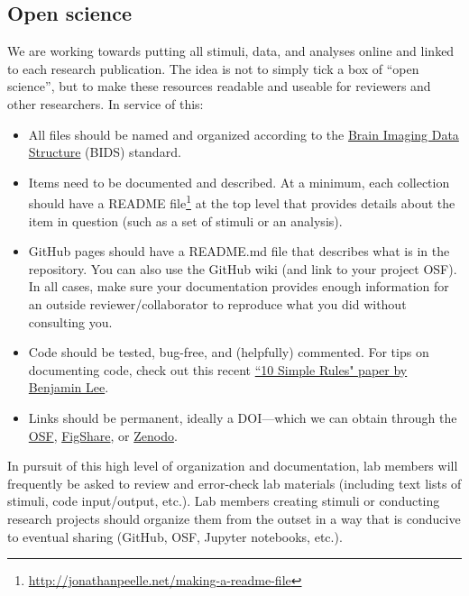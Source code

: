 \documentclass[letterpaper,12pt,oneside]{memoir}
\begin{document}
\subsection{Open science}

We are working towards putting all stimuli, data, and analyses online and linked to each research publication. The idea is not to simply tick a box of ``open science'', but to make these resources readable and useable for reviewers and other researchers. In service of this:

\begin{itemize}
\item All files should be named and organized according to the \href{https://bids.neuroimaging.io/}{Brain Imaging Data Structure} (BIDS) standard.

\item Items need to be documented and described. At a minimum, each collection should have a README file\footnote{\url{http://jonathanpeelle.net/making-a-readme-file}} at the top level that provides details about the item in question (such as a set of stimuli or an analysis).

\item GitHub pages should have a README.md file that describes what is in the repository. You can also use the GitHub wiki (and link to your project OSF). In all cases, make sure your documentation provides enough information for an outside reviewer/collaborator to reproduce what you did without consulting you.

\item Code should be tested, bug-free, and (helpfully) commented. For tips on documenting code, check out this recent \href{https://journals.plos.org/ploscompbiol/article?id=10.1371/journal.pcbi.1006561}{``10 Simple Rules" paper by Benjamin Lee}.

\item Links should be permanent, ideally a DOI---which we can obtain through the \href{http://help.osf.io/m/sharing/l/524208-create-dois-and-arks}{OSF}, \href{https://figshare.com/}{FigShare}, or \href{https://zenodo.org/}{Zenodo}.
\end{itemize}

In pursuit of this high level of organization and documentation, lab members will frequently be asked to review and error-check lab materials (including text lists of stimuli, code input/output, etc.). Lab members creating stimuli or conducting research projects should organize them from the outset in a way that is conducive to eventual sharing (GitHub, OSF, Jupyter notebooks, etc.).
\end{document}

